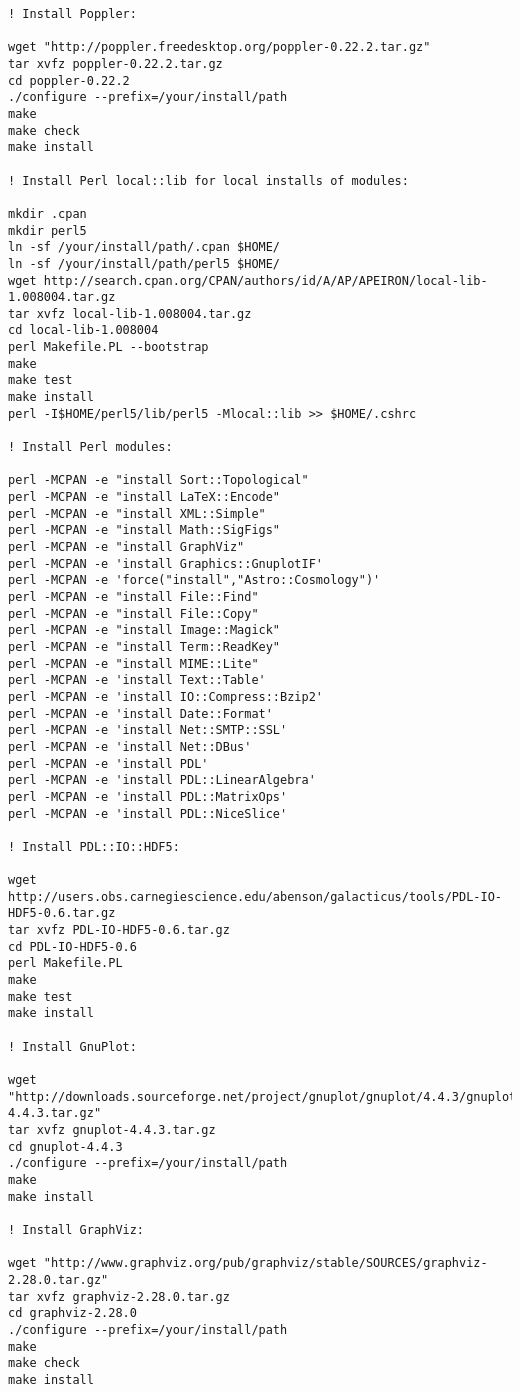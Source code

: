 \begin{lstlisting}[language=simple,stringstyle=\ttfamily,commentstyle=\itshape]
! Install Poppler:

wget "http://poppler.freedesktop.org/poppler-0.22.2.tar.gz"
tar xvfz poppler-0.22.2.tar.gz
cd poppler-0.22.2
./configure --prefix=/your/install/path
make
make check
make install

! Install Perl local::lib for local installs of modules:

mkdir .cpan
mkdir perl5
ln -sf /your/install/path/.cpan $HOME/
ln -sf /your/install/path/perl5 $HOME/
wget http://search.cpan.org/CPAN/authors/id/A/AP/APEIRON/local-lib-1.008004.tar.gz
tar xvfz local-lib-1.008004.tar.gz 
cd local-lib-1.008004
perl Makefile.PL --bootstrap
make
make test
make install
perl -I$HOME/perl5/lib/perl5 -Mlocal::lib >> $HOME/.cshrc

! Install Perl modules:

perl -MCPAN -e "install Sort::Topological"
perl -MCPAN -e "install LaTeX::Encode"
perl -MCPAN -e "install XML::Simple"
perl -MCPAN -e "install Math::SigFigs"
perl -MCPAN -e "install GraphViz"
perl -MCPAN -e 'install Graphics::GnuplotIF'
perl -MCPAN -e 'force("install","Astro::Cosmology")'
perl -MCPAN -e "install File::Find"
perl -MCPAN -e "install File::Copy"
perl -MCPAN -e "install Image::Magick"
perl -MCPAN -e "install Term::ReadKey"
perl -MCPAN -e "install MIME::Lite"
perl -MCPAN -e 'install Text::Table'
perl -MCPAN -e 'install IO::Compress::Bzip2'
perl -MCPAN -e 'install Date::Format'
perl -MCPAN -e 'install Net::SMTP::SSL'
perl -MCPAN -e 'install Net::DBus'
perl -MCPAN -e 'install PDL'
perl -MCPAN -e 'install PDL::LinearAlgebra'
perl -MCPAN -e 'install PDL::MatrixOps'
perl -MCPAN -e 'install PDL::NiceSlice'

! Install PDL::IO::HDF5:

wget http://users.obs.carnegiescience.edu/abenson/galacticus/tools/PDL-IO-HDF5-0.6.tar.gz
tar xvfz PDL-IO-HDF5-0.6.tar.gz
cd PDL-IO-HDF5-0.6
perl Makefile.PL
make
make test
make install

! Install GnuPlot:

wget "http://downloads.sourceforge.net/project/gnuplot/gnuplot/4.4.3/gnuplot-4.4.3.tar.gz"
tar xvfz gnuplot-4.4.3.tar.gz
cd gnuplot-4.4.3
./configure --prefix=/your/install/path
make
make install

! Install GraphViz:

wget "http://www.graphviz.org/pub/graphviz/stable/SOURCES/graphviz-2.28.0.tar.gz"
tar xvfz graphviz-2.28.0.tar.gz
cd graphviz-2.28.0
./configure --prefix=/your/install/path
make
make check
make install


\end{lstlisting}
